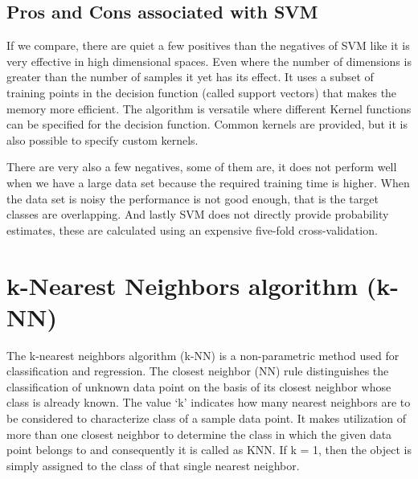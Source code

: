 \subsection{Pros and Cons associated with SVM} \label{Pros and Cons associated with SVM}

\noindent If we compare, there are quiet a few positives than the negatives of SVM like it is very effective in high dimensional spaces. Even where the number of dimensions is greater than the number of samples it yet has its effect. It uses a subset of training points in the decision function (called support vectors) that makes the memory more efficient. The algorithm is versatile where different Kernel functions can be specified for the decision function. Common kernels are
provided, but it is also possible to specify custom kernels. 

\noindent There are very also a few negatives, some of them are, it does not perform well when we have a large data set because the required training time is higher. When the data set is noisy the performance is not good enough, that is the target classes are overlapping. And lastly SVM does not directly provide probability estimates, these are calculated using an expensive five-fold cross-validation.


\newpage

\section{k-Nearest Neighbors algorithm (k-NN)} \label{k-Nearest Neighbors algorithm (k-NN)}
\noindent The k-nearest neighbors algorithm (k-NN) is a non-parametric method used for classification and regression. The closest neighbor (NN) rule distinguishes the classification of unknown data point on the basis of its closest neighbor whose class is already known. The value ‘k’ indicates how many nearest neighbors are to be considered to characterize class of a sample data point. It makes utilization of more than one closest neighbor to determine the class in which the given data point belongs to and consequently it is called as KNN. If k = 1, then the object is simply assigned to the class of that single nearest neighbor.


